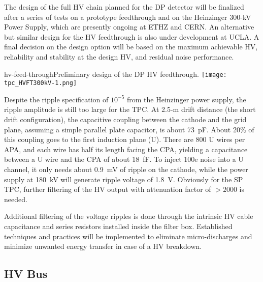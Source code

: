 The design of the full HV chain planned %
for the DP detector will be finalized  after a series of tests on a prototype feedthrough and on the Heinzinger 300-kV Power Supply, which are presently ongoing at ETHZ and CERN. An alternative but similar design for the HV feedthrough is also under development at UCLA. A final decision on the design option will be based on the maximum achievable HV, reliability and stability at the design HV, and residual noise performance.


\begin{cdrfigure}[HV feedthrough]{hv-feed-through}{Preliminary design of the DP HV feedthrough.}
\texttt{[image: tpc\_HVFT300kV-1.png]}
\end{cdrfigure}


Despite the ripple specification of $10^{-5}$ from the Heinzinger power supply, the ripple amplitude is still too large for the TPC.  At 2.5-m drift distance (the short drift configuration), the capacitive coupling between the cathode and the grid plane, assuming a simple parallel plate capacitor, is about 73~pF.  About 20\% of this coupling goes to the first induction plane (U).  There are 800 U wires per APA, and each wire has half its length facing the CPA, yielding a  capacitance between a U wire and the CPA of about 18~fF.  To inject 100e noise into a U channel, it only needs about 0.9~mV of ripple on the cathode, while the power supply at 180~kV will generate ripple voltage of 1.8~V.  Obviously for the SP TPC, further filtering of the HV output with attenuation factor of $>2000$ is needed. 

Additional filtering of the voltage ripples is done
through the intrinsic HV cable capacitance and series resistors
installed inside the filter box. Established techniques and practices
will be implemented to eliminate micro-discharges and minimize
unwanted energy transfer in case of a HV breakdown.


\subsection{HV Bus}

